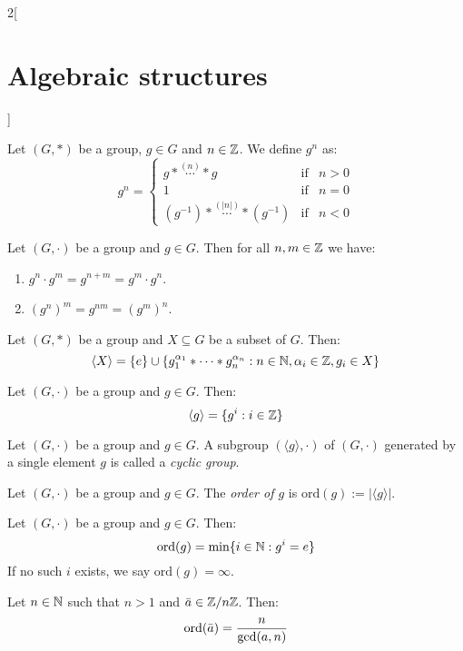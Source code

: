 \documentclass[../../../main.tex]{subfiles}
\begin{document}
\begin{multicols}{2}[\section{Algebraic structures}]
  \begin{definition}
    Let $(G,*)$ be a group, $g\in G$ and $n\in\mathbb{Z} $. We define $g^n$ as:
    $$g^n=\left\{
      \begin{array}{lll}
        g*\overset{(n)}{\cdots}* g                & \text{if} & n>0 \\
        1                                         & \text{if} & n=0 \\
        (g^{-1})*\overset{(|n|)}{\cdots}*(g^{-1}) & \text{if} & n<0
      \end{array}\right.$$
  \end{definition}
  \begin{lemma}
    Let $(G,\cdot)$ be a group and $g\in G$. Then for all $n,m\in\mathbb{Z} $ we have:
    \begin{enumerate}
      \item $g^n\cdot g^m=g^{n+m}=g^m\cdot g^n$.
      \item $(g^n)^m=g^{nm}=(g^m)^n$.
    \end{enumerate}
  \end{lemma}
  \begin{prop}
    Let $(G,*)$ be a group and $X\subseteq G$ be a subset of $G$. Then: $$\langle X\rangle=\{e\}\cup\{g_1^{\alpha_1}*\cdots* g_n^{\alpha_n}:n\in\mathbb{N} ,\alpha_i\in\mathbb{Z} ,g_i\in X\}$$
  \end{prop}
  \begin{corollary}
    Let $(G,\cdot)$ be a group and $g\in G$. Then: $$\langle g\rangle=\{g^i:i\in\mathbb{Z} \}$$
  \end{corollary}
  \begin{definition}
    Let $(G,\cdot)$ be a group and $g\in G$. A subgroup $(\langle g\rangle,\cdot)$ of $(G,\cdot)$ generated by a single element $g$ is called a \textit{cyclic group}.
  \end{definition}
  \begin{definition}
    Let $(G,\cdot)$ be a group and $g\in G$. The \textit{order of $g$} is $\text{ord}(g):=|\langle g\rangle|$.
  \end{definition}
  \begin{prop}
    Let $(G,\cdot)$ be a group and $g\in G$. Then: $$\text{ord}(g)=\min\{i\in\mathbb{N} :g^i=e\}$$
    If no such $i$ exists, we say $\text{ord}(g)=\infty$.
  \end{prop}
  \begin{corollary}
    Let $n\in\mathbb{N} $ such that $n>1$ and $\Bar{a}\in\mathbb{Z} /n\mathbb{Z} $. Then: $$\text{ord}(\Bar{a})=\frac{n}{\gcd(a,n)}$$
  \end{corollary}

\end{multicols}
\end{document}
